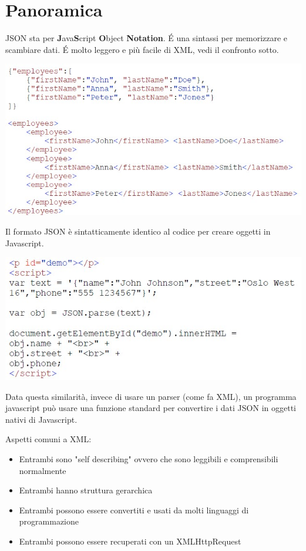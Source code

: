 \section{Panoramica}
JSON sta per \textbf{J}ava\textbf{S}cript \textbf{O}bject \textbf{Notation}. \'E una sintassi per memorizzare e scambiare dati. \'E molto leggero e più facile di XML, vedi il confronto sotto.
\begin{center}
    \includegraphics[scale=0.4]{Images/TecnologieWeb/6/employee.jpg}
\end{center}
Il formato JSON è sintatticamente identico al codice per creare oggetti in Javascript.
\begin{center}
    \includegraphics[scale=0.4]{Images/TecnologieWeb/6/script.jpg}
\end{center}
Data questa similarità, invece di usare un parser (come fa XML), un programma javascript  può usare una funzione standard per convertire i dati JSON in oggetti nativi di Javascript. 

Aspetti comuni a XML:
\begin{itemize}
    \item Entrambi sono "self describing" ovvero che sono leggibili e comprensibili normalmente
    \item Entrambi hanno struttura gerarchica
    \item Entrambi possono essere convertiti e usati da molti linguaggi di programmazione
    \item Entrambi possono essere recuperati con un XMLHttpRequest
\end{itemize}

